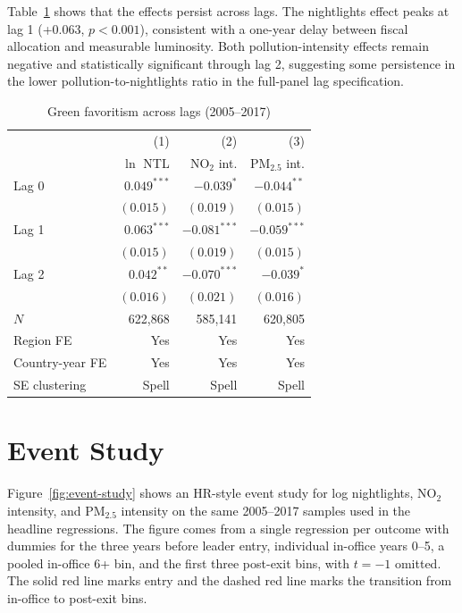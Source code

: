 \documentclass[9pt,twocolumn,twoside]{pnas-new}
\begin{document}
Table~\ref{tab:lag-table} shows that the effects persist across lags. The nightlights effect peaks at lag 1 (+0.063, $p < 0.001$), consistent with a one-year delay between fiscal allocation and measurable luminosity. Both pollution-intensity effects remain negative and statistically significant through lag 2, suggesting some persistence in the lower pollution-to-nightlights ratio in the full-panel lag specification.

\begin{table}[t]
\centering
\caption{Green favoritism across lags (2005--2017)}
\small
\begin{tabular*}{\columnwidth}{@{\extracolsep{\fill}}lrrr}
 & (1) & (2) & (3) \\
 & $\ln$ NTL & NO$_2$ int. & PM$_{2.5}$ int. \\
\midrule
Lag 0 & $0.049^{***}$ & $-0.039^{*}$ & $-0.044^{**}$ \\
      & $(0.015)$     & $(0.019)$    & $(0.015)$ \\
Lag 1 & $0.063^{***}$ & $-0.081^{***}$ & $-0.059^{***}$ \\
      & $(0.015)$     & $(0.019)$      & $(0.015)$ \\
Lag 2 & $0.042^{**}$  & $-0.070^{***}$ & $-0.039^{*}$ \\
      & $(0.016)$     & $(0.021)$      & $(0.016)$ \\
\midrule
$N$              & 622,868 & 585,141 & 620,805 \\
Region FE        & Yes & Yes & Yes \\
Country-year FE  & Yes & Yes & Yes \\
SE clustering    & Spell & Spell & Spell \\
\bottomrule
\end{tabular*}
\label{tab:lag-table}
\end{table}

\section{Event Study}

Figure~\ref{fig:event-study} shows an HR-style event study for log nightlights, NO$_2$ intensity, and PM$_{2.5}$ intensity on the same 2005--2017 samples used in the headline regressions. The figure comes from a single regression per outcome with dummies for the three years before leader entry, individual in-office years 0--5, a pooled in-office 6+ bin, and the first three post-exit bins, with $t=-1$ omitted. The solid red line marks entry and the dashed red line marks the transition from in-office to post-exit bins.
\end{document}
